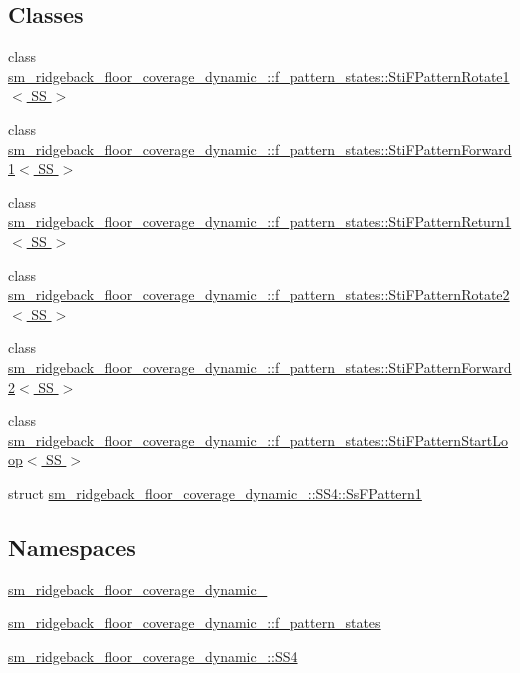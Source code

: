 \subsection*{Classes}
\begin{DoxyCompactItemize}
\item 
class \hyperlink{structsm__ridgeback__floor__coverage__dynamic__1_1_1f__pattern__states_1_1StiFPatternRotate1}{sm\+\_\+ridgeback\+\_\+floor\+\_\+coverage\+\_\+dynamic\+\_\+::f\+\_\+pattern\+\_\+states\+::\+Sti\+F\+Pattern\+Rotate1$<$ S\+S $>$}
\item 
class \hyperlink{structsm__ridgeback__floor__coverage__dynamic__1_1_1f__pattern__states_1_1StiFPatternForward1}{sm\+\_\+ridgeback\+\_\+floor\+\_\+coverage\+\_\+dynamic\+\_\+::f\+\_\+pattern\+\_\+states\+::\+Sti\+F\+Pattern\+Forward1$<$ S\+S $>$}
\item 
class \hyperlink{structsm__ridgeback__floor__coverage__dynamic__1_1_1f__pattern__states_1_1StiFPatternReturn1}{sm\+\_\+ridgeback\+\_\+floor\+\_\+coverage\+\_\+dynamic\+\_\+::f\+\_\+pattern\+\_\+states\+::\+Sti\+F\+Pattern\+Return1$<$ S\+S $>$}
\item 
class \hyperlink{structsm__ridgeback__floor__coverage__dynamic__1_1_1f__pattern__states_1_1StiFPatternRotate2}{sm\+\_\+ridgeback\+\_\+floor\+\_\+coverage\+\_\+dynamic\+\_\+::f\+\_\+pattern\+\_\+states\+::\+Sti\+F\+Pattern\+Rotate2$<$ S\+S $>$}
\item 
class \hyperlink{structsm__ridgeback__floor__coverage__dynamic__1_1_1f__pattern__states_1_1StiFPatternForward2}{sm\+\_\+ridgeback\+\_\+floor\+\_\+coverage\+\_\+dynamic\+\_\+::f\+\_\+pattern\+\_\+states\+::\+Sti\+F\+Pattern\+Forward2$<$ S\+S $>$}
\item 
class \hyperlink{structsm__ridgeback__floor__coverage__dynamic__1_1_1f__pattern__states_1_1StiFPatternStartLoop}{sm\+\_\+ridgeback\+\_\+floor\+\_\+coverage\+\_\+dynamic\+\_\+::f\+\_\+pattern\+\_\+states\+::\+Sti\+F\+Pattern\+Start\+Loop$<$ S\+S $>$}
\item 
struct \hyperlink{structsm__ridgeback__floor__coverage__dynamic__1_1_1SS4_1_1SsFPattern1}{sm\+\_\+ridgeback\+\_\+floor\+\_\+coverage\+\_\+dynamic\+\_\+::\+S\+S4\+::\+Ss\+F\+Pattern1}
\end{DoxyCompactItemize}
\subsection*{Namespaces}
\begin{DoxyCompactItemize}
\item 
 \hyperlink{namespacesm__ridgeback__floor__coverage__dynamic__1}{sm\+\_\+ridgeback\+\_\+floor\+\_\+coverage\+\_\+dynamic\+\_}
\item 
 \hyperlink{namespacesm__ridgeback__floor__coverage__dynamic__1_1_1f__pattern__states}{sm\+\_\+ridgeback\+\_\+floor\+\_\+coverage\+\_\+dynamic\+\_\+::f\+\_\+pattern\+\_\+states}
\item 
 \hyperlink{namespacesm__ridgeback__floor__coverage__dynamic__1_1_1SS4}{sm\+\_\+ridgeback\+\_\+floor\+\_\+coverage\+\_\+dynamic\+\_\+::\+S\+S4}
\end{DoxyCompactItemize}
